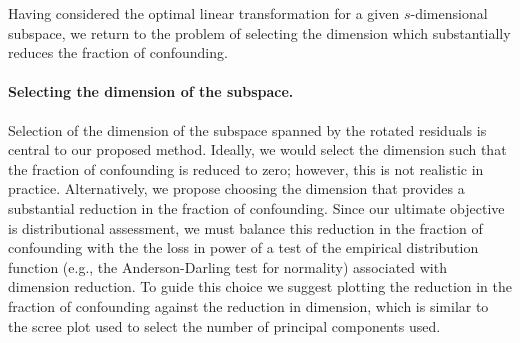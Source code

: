 \documentclass[12pt]{article} %
\newcommand{\hh}[1]{{\color{orange} #1}}
\newcommand{\al}[1]{{\color{red} #1}}
\newcommand{\ginv}{\ensuremath{^{-}}}
\DeclareMathOperator{\rank}{rank}
\begin{document}

\al{Having considered the optimal linear transformation for a given $s$-dimensional subspace, we return to the problem of selecting the dimension which substantially reduces the fraction of confounding.}


\paragraph{Selecting the dimension of the subspace.}
\al{Selection of the dimension of the subspace spanned by the rotated residuals is central to our proposed method. Ideally, we would select the dimension such that the fraction of confounding is reduced to zero; however, this is not realistic in practice. Alternatively, we propose choosing the dimension that provides a substantial reduction in the fraction of confounding. Since our ultimate objective is distributional assessment, we must balance this reduction in the fraction of confounding with the the loss in power of a test of the empirical distribution function (e.g., the Anderson-Darling test for normality) associated with dimension reduction. To guide this choice we suggest plotting the reduction in the fraction of confounding against the reduction in dimension, which is similar to the scree plot used to select the number of principal components used.}



\end{document}
